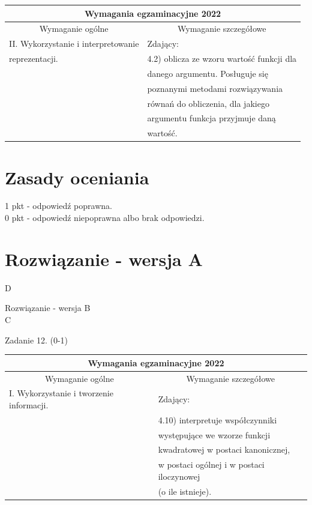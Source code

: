 \documentclass[10pt]{article}
\begin{document}
\begin{center}
\begin{tabular}{|l|l|}
\hline
\multicolumn{2}{|c|}{Wymagania egzaminacyjne 2022} \\
\hline
\multicolumn{1}{|c|}{Wymaganie ogólne} & \multicolumn{1}{c|}{Wymaganie szczegółowe} \\
\hline
II. Wykorzystanie i interpretowanie & Zdający: \\
reprezentacji. & 4.2) oblicza ze wzoru wartość funkcji dla \\
 & danego argumentu. Posługuje się \\
 & poznanymi metodami rozwiązywania \\
 & równań do obliczenia, dla jakiego \\
 & argumentu funkcja przyjmuje daną \\
 & wartość. \\
\hline
\end{tabular}
\end{center}

\section*{Zasady oceniania}
1 pkt - odpowiedź poprawna.\\
0 pkt - odpowiedź niepoprawna albo brak odpowiedzi.

\section*{Rozwiązanie - wersja A}
D

Rozwiązanie - wersja B\\
C

Zadanie 12. (0-1)

\begin{center}
\begin{tabular}{|l|l|}
\hline
\multicolumn{2}{|c|}{Wymagania egzaminacyjne 2022} \\
\hline
\multicolumn{1}{|c|}{Wymaganie ogólne} & \multicolumn{1}{c|}{Wymaganie szczegółowe} \\
\hline
I. Wykorzystanie i tworzenie informacji. & Zdający: \\
 & 4.10) interpretuje współczynniki \\
 & występujące we wzorze funkcji \\
 & kwadratowej w postaci kanonicznej, \\
 & w postaci ogólnej i w postaci iloczynowej \\
 & (o ile istnieje). \\
\hline
\end{tabular}
\end{center}
\end{document}
